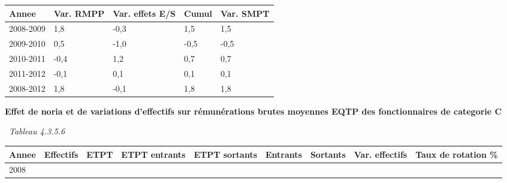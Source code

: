 \begin{longtable}[]{@{}lllll@{}}
\toprule
Annee & Var. RMPP & Var. effets E/S & Cumul & Var. SMPT\tabularnewline
\midrule
\endhead
2008-2009 & 1,8 & -0,3 & 1,5 & 1,5\tabularnewline
2009-2010 & 0,5 & -1,0 & -0,5 & -0,5\tabularnewline
2010-2011 & -0,4 & 1,2 & 0,7 & 0,7\tabularnewline
2011-2012 & -0,1 & 0,1 & 0,1 & 0,1\tabularnewline
2008-2012 & 1,8 & -0,1 & 1,8 & 1,8\tabularnewline
\bottomrule
\end{longtable}

\textbf{Effet de noria et de variations d'effectifs sur rémunérations
brutes moyennes EQTP des fonctionnaires de categorie C}

~\emph{Tableau 4.3.5.6}

\begin{longtable}[]{@{}lllllllll@{}}
\toprule
\begin{minipage}[b]{0.05\columnwidth}\raggedright
Annee\strut
\end{minipage} & \begin{minipage}[b]{0.08\columnwidth}\raggedright
Effectifs\strut
\end{minipage} & \begin{minipage}[b]{0.05\columnwidth}\raggedright
ETPT\strut
\end{minipage} & \begin{minipage}[b]{0.10\columnwidth}\raggedright
ETPT entrants\strut
\end{minipage} & \begin{minipage}[b]{0.10\columnwidth}\raggedright
ETPT sortants\strut
\end{minipage} & \begin{minipage}[b]{0.07\columnwidth}\raggedright
Entrants\strut
\end{minipage} & \begin{minipage}[b]{0.07\columnwidth}\raggedright
Sortants\strut
\end{minipage} & \begin{minipage}[b]{0.11\columnwidth}\raggedright
Var. effectifs\strut
\end{minipage} & \begin{minipage}[b]{0.14\columnwidth}\raggedright
Taux de rotation \%\strut
\end{minipage}\tabularnewline
\midrule
\endhead
\begin{minipage}[t]{0.05\columnwidth}\raggedright
2008\strut
\end{minipage} & \begin{minipage}[t]{0.08\columnwidth}\raggedright

\end{minipage}
\end{longtable}

